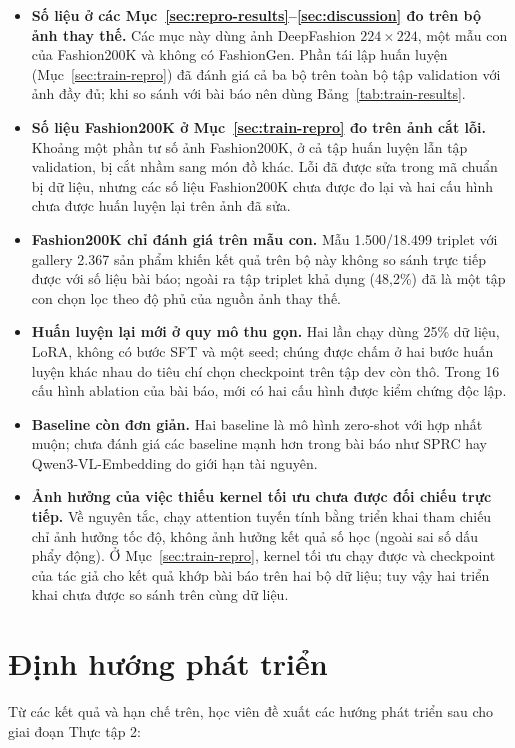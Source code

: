 \begin{itemize}
    \item \textbf{Số liệu ở các Mục~\ref{sec:repro-results}--\ref{sec:discussion} đo trên bộ ảnh thay thế.} Các mục này dùng ảnh DeepFashion $224 \times 224$, một mẫu con của Fashion200K và không có FashionGen. Phần tái lập huấn luyện (Mục~\ref{sec:train-repro}) đã đánh giá cả ba bộ trên toàn bộ tập validation với ảnh đầy đủ; khi so sánh với bài báo nên dùng Bảng~\ref{tab:train-results}.
    \item \textbf{Số liệu Fashion200K ở Mục~\ref{sec:train-repro} đo trên ảnh cắt lỗi.} Khoảng một phần tư số ảnh Fashion200K, ở cả tập huấn luyện lẫn tập validation, bị cắt nhầm sang món đồ khác. Lỗi đã được sửa trong mã chuẩn bị dữ liệu, nhưng các số liệu Fashion200K chưa được đo lại và hai cấu hình chưa được huấn luyện lại trên ảnh đã sửa.
    \item \textbf{Fashion200K chỉ đánh giá trên mẫu con.} Mẫu 1.500/18.499 triplet với gallery 2.367 sản phẩm khiến kết quả trên bộ này không so sánh trực tiếp được với số liệu bài báo; ngoài ra tập triplet khả dụng (48,2\%) đã là một tập con chọn lọc theo độ phủ của nguồn ảnh thay thế.
    \item \textbf{Huấn luyện lại mới ở quy mô thu gọn.} Hai lần chạy dùng 25\% dữ liệu, LoRA, không có bước SFT và một seed; chúng được chấm ở hai bước huấn luyện khác nhau do tiêu chí chọn checkpoint trên tập dev còn thô. Trong 16 cấu hình ablation của bài báo, mới có hai cấu hình được kiểm chứng độc lập.
    \item \textbf{Baseline còn đơn giản.} Hai baseline là mô hình zero-shot với hợp nhất muộn; chưa đánh giá các baseline mạnh hơn trong bài báo như SPRC hay Qwen3-VL-Embedding do giới hạn tài nguyên.
    \item \textbf{Ảnh hưởng của việc thiếu kernel tối ưu chưa được đối chiếu trực tiếp.} Về nguyên tắc, chạy attention tuyến tính bằng triển khai tham chiếu chỉ ảnh hưởng tốc độ, không ảnh hưởng kết quả số học (ngoài sai số dấu phẩy động). Ở Mục~\ref{sec:train-repro}, kernel tối ưu chạy được và checkpoint của tác giả cho kết quả khớp bài báo trên hai bộ dữ liệu; tuy vậy hai triển khai chưa được so sánh trên cùng dữ liệu.
\end{itemize}

\section{Định hướng phát triển}

Từ các kết quả và hạn chế trên, học viên đề xuất các hướng phát triển sau cho giai đoạn Thực tập 2:

